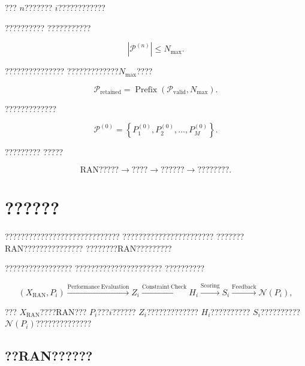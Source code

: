 ???
$n$???????
$i$????????????

??????????
???????????

\begin{equation}
\left|
\mathcal{P}^{(n)}
\right|
\leq
N_{\max}.
\label{eq:maximum_policy_count_reduced}
\end{equation}

???????????????
?????????????$N_{\max}$????

\begin{equation}
\mathcal{P}_{\mathrm{retained}}
=
\operatorname{Prefix}
\left(
\mathcal{P}_{\mathrm{valid}},
N_{\max}
\right).
\label{eq:policy_prefix_truncation_reduced}
\end{equation}

?????????????

\begin{equation}
\mathcal{P}^{(0)}
=
\left\{
P_1^{(0)},
P_2^{(0)},
\ldots,
P_M^{(0)}
\right\}.
\label{eq:initial_policy_set_reduced}
\end{equation}

?????????
?????

\begin{equation}
\text{RAN?????}
\longrightarrow
\text{????}
\longrightarrow
\text{??????}
\longrightarrow
\text{????????}.
\label{eq:ran_requirement_to_candidate_policies}
\end{equation}

\section{??????}
\label{sec:candidate_policy_evaluation}

?????????????????????????????
???????????????????????
???????RAN???????????????
????????RAN?????????

?????????????????
??????????????????????
??????????

\begin{equation}
\left(
X_{\mathrm{RAN}},
P_i
\right)
\xrightarrow{\mathrm{Performance\ Evaluation}}
Z_i
\xrightarrow{\mathrm{Constraint\ Check}}
H_i
\xrightarrow{\mathrm{Scoring}}
S_i
\xrightarrow{\mathrm{Feedback}}
\mathcal{N}(P_i),
\label{eq:policy_evaluation_flow_reduced}
\end{equation}

???
$X_{\mathrm{RAN}}$????RAN???
$P_i$???$i$??????
$Z_i$?????????????
$H_i$??????????
$S_i$??????????
$\mathcal{N}(P_i)$??????????????


\subsection*{??RAN??????}

